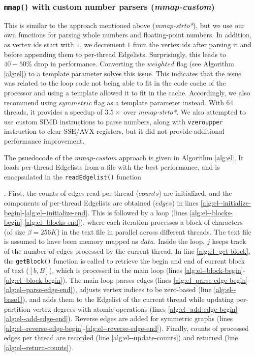 \subsubsection{\texttt{mmap()} with custom number parsers (\textit{mmap-custom})}
\label{sec:el-mmap-custom}

This is similar to the approach mentioned above (\textit{mmap-strto*}), but we use our own functions for parsing whole numbers and floating-point numbers. In addition, as vertex ids start with $1$, we decrement $1$ from the vertex ids after parsing it and before appending them to per-thread Edgelists. Surprisingly, this leads to $40-50\%$ drop in performance. Converting the $weighted$ flag (see Algorithm \ref{alg:el}) to a template parameter solves this issue. This indicates that the issue was related to the loop code not being able to fit in the code cache of the processor and using a template allowed it to fit in the cache. Accordingly, we also recommend using $symmetric$ flag as a template parameter instead. With 64 threads, it provides a speedup of $3.5\times$ over \textit{mmap-strto*}. We also attempted to use custom SIMD instructions to parse numbers, along with \texttt{vzeroupper} instruction to clear SSE/AVX registers, but it did not provide additional performance improvement.






The psuedocode of the \textit{mmap-custom} approach is given in Algorithm \ref{alg:el}. It loads per-thread Edgelists from a file with the best performance, and is enacpsulated in the \texttt{readEdgelist()} function. First, the counts of edges read per thread ($counts$) are initialized, and the components of per-thread Edgelists are obtained ($edges$) in lines \ref{alg:el--initialize-begin}-\ref{alg:el--initialize-end}. This is followed by a loop (lines \ref{alg:el--blocks-begin}-\ref{alg:el--blocks-end}), where each iteration processes a block of characters (of size $\beta = 256K$) in the text file in parallel across different threads. The text file is assumed to have been memory mapped as $data$. Inside the loop, $j$ keeps track of the number of edges processed by the current thread. In line \ref{alg:el--get-block}, the \texttt{getBlock()} function is called to retrieve the begin and end of current block of text ($[b, B]$), which is processed in the main loop (lines \ref{alg:el--block-begin}-\ref{alg:el--block-begin}). The main loop parses edges (lines \ref{alg:el--parse-edge-begin}-\ref{alg:el--parse-edge-end}), adjusts vertex indices to be zero-based (line \ref{alg:el--base1}), and adds them to the Edgelist of the current thread while updating per-partition vertex degrees with atomic operations (lines \ref{alg:el--add-edge-begin}-\ref{alg:el--add-edge-end}). Reverse edges are added for symmetric graphs (lines \ref{alg:el--reverse-edge-begin}-\ref{alg:el--reverse-edge-end}). Finally, counts of processed edges per thread are recorded (line \ref{alg:el--update-counts}) and returned (line \ref{alg:el--return-counts}).

